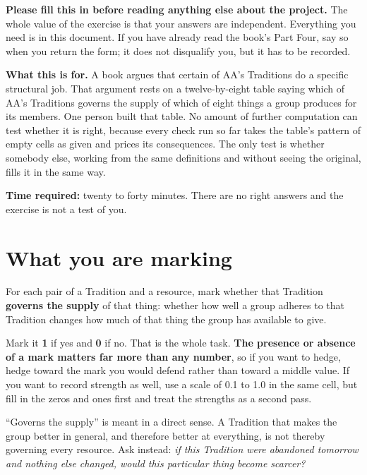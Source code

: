 \documentclass[11pt]{article}
\begin{document}

\begin{note}
\textbf{Please fill this in before reading anything else about the project.} The whole value of
the exercise is that your answers are independent. Everything you need is in this document. If
you have already read the book's Part Four, say so when you return the form; it does not
disqualify you, but it has to be recorded.
\end{note}

\vspace{4pt}
\textbf{What this is for.} A book argues that certain of AA's Traditions do a specific structural
job. That argument rests on a twelve-by-eight table saying which of AA's Traditions governs the
supply of which of eight things a group produces for its members. One person built that table. No
amount of further computation can test whether it is right, because every check run so far takes
the table's pattern of empty cells as given and prices its consequences. The only test is whether
somebody else, working from the same definitions and without seeing the original, fills it in the
same way.

\textbf{Time required:} twenty to forty minutes. There are no right answers and the exercise is
not a test of you.

\section{What you are marking}

For each pair of a Tradition and a resource, mark whether that Tradition \textbf{governs the
supply} of that thing: whether how well a group adheres to that Tradition changes how much of that
thing the group has available to give.

Mark it \textbf{1} if yes and \textbf{0} if no. That is the whole task. \textbf{The presence or
absence of a mark matters far more than any number}, so if you want to hedge, hedge toward the
mark you would defend rather than toward a middle value. If you want to record strength as well,
use a scale of 0.1 to 1.0 in the same cell, but fill in the zeros and ones first and treat the
strengths as a second pass.

\begin{note}
``Governs the supply'' is meant in a direct sense. A Tradition that makes the group better in
general, and therefore better at everything, is not thereby governing every resource. Ask instead:
\textit{if this Tradition were abandoned tomorrow and nothing else changed, would this particular
thing become scarcer?}
\end{note}
\end{document}
